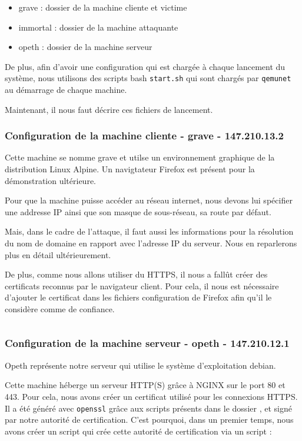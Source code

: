 \begin{itemize}
\item grave : dossier de la machine cliente et victime
\item immortal : dossier de la machine attaquante
\item opeth : dossier de la machine serveur
\end{itemize}

De plus, afin d'avoir une configuration qui est chargée à chaque lancement du système, nous utilisons des scripts bash \verb+start.sh+ qui sont chargés par \verb+qemunet+ au démarrage de chaque machine.

Maintenant, il nous faut décrire ces fichiers de lancement.

\subsubsection{Configuration de la machine cliente - grave - 147.210.13.2}
Cette machine se nomme grave et utilse un environnement graphique de la distribution Linux Alpine. Un navigtateur Firefox est présent pour la démonstration ultérieure.

Pour que la machine puisse accéder au réseau internet, nous devons lui spécifier une addresse IP ainsi que son masque de sous-réseau, sa route par défaut.

Mais, dans le cadre de l'attaque, il faut aussi les informations pour la résolution du nom de domaine en rapport avec l'adresse IP du serveur. Nous en reparlerons plus en détail ultérieurement.

De plus, comme nous allons utiliser du HTTPS, il nous a fallût créer des certificats reconnus par le navigateur client. Pour cela, il nous est nécessaire d'ajouter le certificat dans les fichiers configuration de Firefox afin qu'il le considère comme de confiance.

\inputminted[bgcolor=lbcolor, breaklines]{shell}{../sslstrip2/grave/start.sh}

\subsubsection{Configuration de la machine serveur - opeth - 147.210.12.1}

Opeth représente notre serveur qui utilise le système d'exploitation debian.

Cette machine héberge un serveur HTTP(S) grâce à NGINX sur le port 80 et 443. Pour cela, nous avons créer un certificat utilisé pour les connexions HTTPS. Il a été généré avec \verb+openssl+ grâce aux scripts présents dans le dossier , et signé par notre autorité de certification. C'est pourquoi, dans un premier temps, nous avons créer un script qui crée cette autorité de certification via un script :

